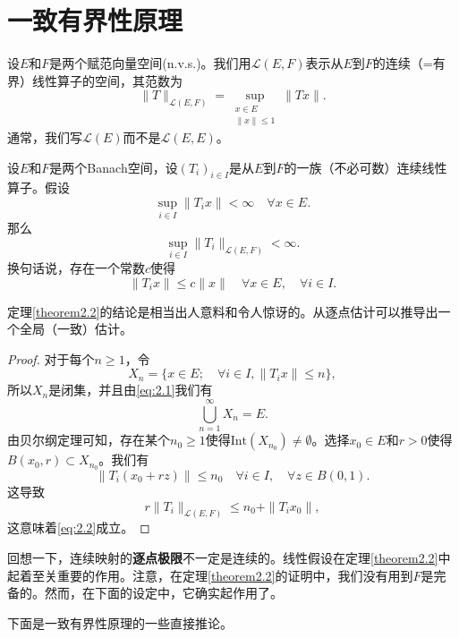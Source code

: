 \section{一致有界性原理}


设$E$和$F$是两个赋范向量空间(n.v.s.)。我们用$\mathcal{L}(E, F)$表示从$E$到$F$的连续（=有界）线性算子的空间，其范数为
\[
\|T\|_{\mathcal{L}(E, F)} = \sup_{\substack{x \in E \\ \|x\| \leq 1}} \|Tx\|.
\]
通常，我们写$\mathcal{L}(E)$而不是$\mathcal{L}(E, E)$。

\begin{theorem}\label{theorem2.2}
设$E$和$F$是两个Banach空间，设$(T_i)_{i \in I}$是从$E$到$F$的一族（不必可数）连续线性算子。假设
\begin{equation}
\sup_{i \in I} \|T_i x\| < \infty \quad \forall x \in E. \label{eq:2.1}
\end{equation}
那么
\begin{equation}
\sup_{i \in I} \|T_i\|_{\mathcal{L}(E, F)} < \infty. \label{eq:2.2}
\end{equation}
换句话说，存在一个常数$c$使得
\[
\|T_i x\| \leq c\|x\| \quad \forall x \in E, \quad \forall i \in I.
\]
\end{theorem}

\begin{remark}
定理\ref{theorem2.2}的结论是相当出人意料和令人惊讶的。从逐点估计可以推导出一个全局（一致）估计。
\end{remark}

\begin{proof}
对于每个$n \geq 1$，令
\[
X_n = \{x \in E; \quad \forall i \in I, \|T_i x\| \leq n\},
\]
所以$X_n$是闭集，并且由\eqref{eq:2.1}我们有
\[
\bigcup_{n=1}^\infty X_n = E.
\]
由贝尔纲定理可知，存在某个$n_0 \geq 1$使得$\text{Int}(X_{n_0}) \neq \emptyset$。选择$x_0 \in E$和$r > 0$使得$B(x_0, r) \subset X_{n_0}$。我们有
\[
\|T_i(x_0+rz)\| \leq n_0 \quad \forall i \in I, \quad \forall z \in B(0, 1).
\]
这导致
\[
r\|T_i\|_{\mathcal{L}(E,F)} \leq n_0 + \|T_i x_0\|,
\]
这意味着\eqref{eq:2.2}成立。
\end{proof}

\begin{remark}
回想一下，连续映射的\textbf{逐点极限}不一定是连续的。线性假设在定理\ref{theorem2.2}中起着至关重要的作用。注意，在定理\ref{theorem2.2}的证明中，我们没有用到$F$是完备的。然而，在下面的设定中，它确实起作用了。
\end{remark}

下面是一致有界性原理的一些直接推论。

